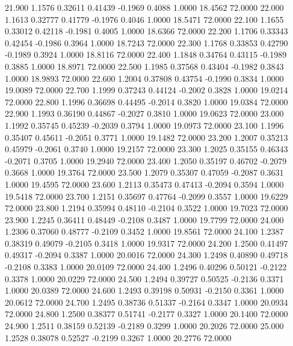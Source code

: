   21.900   1.1576   0.32611   0.41439  -0.1969   0.4088   1.0000  18.4562  72.0000
  22.000   1.1613   0.32777   0.41779  -0.1976   0.4046   1.0000  18.5471  72.0000
  22.100   1.1655   0.33012   0.42118  -0.1981   0.4005   1.0000  18.6366  72.0000
  22.200   1.1706   0.33343   0.42454  -0.1986   0.3964   1.0000  18.7243  72.0000
  22.300   1.1768   0.33853   0.42790  -0.1989   0.3924   1.0000  18.8116  72.0000
  22.400   1.1848   0.34764   0.43115  -0.1989   0.3885   1.0000  18.8971  72.0000
  22.500   1.1985   0.37568   0.43404  -0.1982   0.3843   1.0000  18.9893  72.0000
  22.600   1.2004   0.37808   0.43754  -0.1990   0.3834   1.0000  19.0089  72.0000
  22.700   1.1999   0.37243   0.44124  -0.2002   0.3828   1.0000  19.0214  72.0000
  22.800   1.1996   0.36698   0.44495  -0.2014   0.3820   1.0000  19.0384  72.0000
  22.900   1.1993   0.36190   0.44867  -0.2027   0.3810   1.0000  19.0623  72.0000
  23.000   1.1992   0.35745   0.45239  -0.2039   0.3794   1.0000  19.0973  72.0000
  23.100   1.1996   0.35407   0.45611  -0.2051   0.3771   1.0000  19.1482  72.0000
  23.200   1.2007   0.35213   0.45979  -0.2061   0.3740   1.0000  19.2157  72.0000
  23.300   1.2025   0.35155   0.46343  -0.2071   0.3705   1.0000  19.2940  72.0000
  23.400   1.2050   0.35197   0.46702  -0.2079   0.3668   1.0000  19.3764  72.0000
  23.500   1.2079   0.35307   0.47059  -0.2087   0.3631   1.0000  19.4595  72.0000
  23.600   1.2113   0.35473   0.47413  -0.2094   0.3594   1.0000  19.5418  72.0000
  23.700   1.2151   0.35697   0.47764  -0.2099   0.3557   1.0000  19.6229  72.0000
  23.800   1.2194   0.35994   0.48110  -0.2104   0.3522   1.0000  19.7023  72.0000
  23.900   1.2245   0.36411   0.48449  -0.2108   0.3487   1.0000  19.7799  72.0000
  24.000   1.2306   0.37060   0.48777  -0.2109   0.3452   1.0000  19.8561  72.0000
  24.100   1.2387   0.38319   0.49079  -0.2105   0.3418   1.0000  19.9317  72.0000
  24.200   1.2500   0.41497   0.49317  -0.2094   0.3387   1.0000  20.0016  72.0000
  24.300   1.2498   0.40890   0.49718  -0.2108   0.3383   1.0000  20.0109  72.0000
  24.400   1.2496   0.40296   0.50121  -0.2122   0.3378   1.0000  20.0229  72.0000
  24.500   1.2494   0.39727   0.50525  -0.2136   0.3371   1.0000  20.0389  72.0000
  24.600   1.2493   0.39198   0.50931  -0.2150   0.3361   1.0000  20.0612  72.0000
  24.700   1.2495   0.38736   0.51337  -0.2164   0.3347   1.0000  20.0934  72.0000
  24.800   1.2500   0.38377   0.51741  -0.2177   0.3327   1.0000  20.1400  72.0000
  24.900   1.2511   0.38159   0.52139  -0.2189   0.3299   1.0000  20.2026  72.0000
  25.000   1.2528   0.38078   0.52527  -0.2199   0.3267   1.0000  20.2776  72.0000
